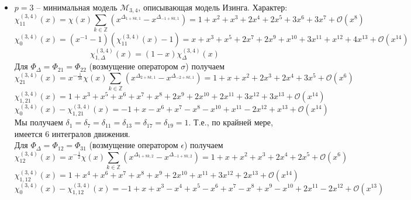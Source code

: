 \documentclass[12pt]{article}
\theoremstyle{definition}
\begin{document}
\begin{itemize}
    \item $p=3$ -- минимальная модель $\mathcal{M}_{3,4}$, описывающая модель Изинга. Характер:
    \begin{equation}
        \chi^{(3,4)}_{11}(x)=\chi(x)\sum\limits_{k\in\mathbb{Z}}(x^{\Delta_{1+8k,1}}-x^{\Delta_{-1+8k,1}})=1+x^2+x^3+2x^4+2x^5+3x^6+3x^7+\mathcal{O}(x^8)
    \end{equation}
    \begin{equation}
        \chi^{(3,4)}_0(x)=(x^{-1}-1)(\chi^{(3,4)}_{11}(x)-1)=x+x^3+x^5+2x^7+2x^9+x^{10}+3x^{11}+x^{12}+4x^{13}+\mathcal{O}(x^{14})
    \end{equation}
    \begin{equation}
        \chi^{(3,4)}_{1,\Delta}(x)=(1-x)\chi^{(3,4)}_\Delta(x)
    \end{equation}
    Для $\Phi_\Delta =\Phi_{21}=\Phi_{22}$ (возмущение оператором $\sigma$) получаем
    \begin{equation}
        \chi^{(3,4)}_{21}(x)=x^{-\frac{1}{16}}\chi(x)\sum\limits_{k\in\mathbb{Z}}(x^{\Delta_{2+8k,1}}-x^{\Delta_{-2+8k,1}})=1+x+x^2+2x^3+2x^4+3x^5+\mathcal{O}(x^6)
    \end{equation}
    \begin{equation}
        \chi^{(3,4)}_{1,21}(x)=1+x^3+x^5+x^6+x^7+x^8+2x^9+2x^{10}+2x^{11}+3x^{12}+3x^{13}+\mathcal{O}(x^{14})
    \end{equation}
    \begin{equation}
        \chi^{(3,4)}_0(x)-\chi^{(3,4)}_{1,21}(x)=-1+x-x^6+x^7-x^8-x^{10}+x^{11}-2x^{12}+x^{13}+\mathcal{O}(x^{14})
    \end{equation}
    Мы получаем $\delta_1=\delta_7=\delta_{11}=\delta_{13}=\delta_{17}=\delta_{19}=1$. Т.е., по крайней мере, имеется 6 интегралов движения.\\
    Для $\Phi_\Delta=\Phi_{12}=\Phi_{31}$ (возмущение оператором $\epsilon$) получаем
    \begin{equation}
        \chi^{(3,4)}_{12}(x)=x^{-\frac{1}{2}}\chi(x)\sum\limits_{k\in\mathbb{Z}}(x^{\Delta_{1+8k,2}}-x^{\Delta_{-1+8k,2}})=1+x+x^2+x^3+2x^4+2x^5+\mathcal{O}(x^6)
    \end{equation}
    \begin{equation}
        \chi^{(3,4)}_{1,12}(x)=1+x^4+x^6+x^7+x^8+x^9+2x^{10}+x^{11}+3x^{12}+2x^{13}+\mathcal{O}(x^{14})
    \end{equation}
    \begin{equation}
        \chi^{(3,4)}_0(x)-\chi^{(3,4)}_{1,12}(x)=-1+x+x^3-x^4+x^5-x^6+x^7-x^8+x^9-x^{10}+2x^{11}-2x^{12}+\mathcal{O}(x^{13})

\end{equation}
\end{itemize}
\end{document}
